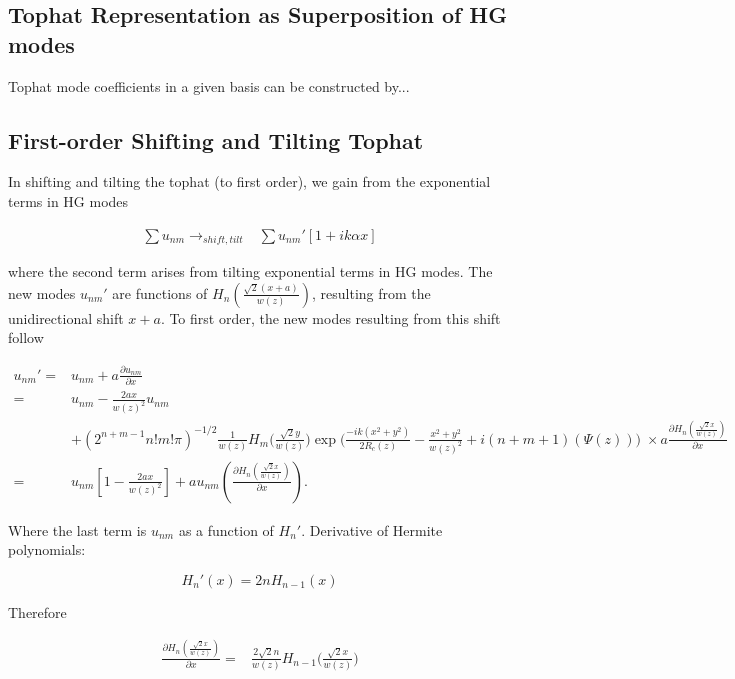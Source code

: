 \documentclass[aps,twoside,secnumarabic,balancelastpage,amsmath,amssymb,nofootinbib,hyperref=pdftex]{revtex4}
\begin{document}
\subsection{Tophat Representation as Superposition of HG modes}

Tophat mode coefficients in a given basis can be constructed by...

\clearpage

\subsection{First-order Shifting and Tilting Tophat}

In shifting and tilting the tophat (to first order), we gain from the exponential terms in HG modes

\begin{align*}
\sum u_{nm} \rightarrow_{shift,tilt} &
    \sum u_{nm}' \left[
        1+ i k \alpha x
    \right]
\end{align*}


where the second term arises from tilting exponential terms in HG modes. The new modes $u_{nm}'$ are functions of $H_n(\frac{\sqrt{2}(x+a)}{w(z)})$, resulting from the unidirectional shift $x+a$. To first order, the new modes resulting from this shift follow

\begin{align*}
	u_{nm}' =& u_{nm} + a \frac{\partial u_{nm}}{\partial x}
	\\=&
		u_{nm} 
		-
		\frac{2ax}{w(z)^2} 
		u_{nm}
		\\&+
		(2^{n+m-1}n!m!\pi)^{-1/2}
		\frac{1}{w(z)}
		H_{m} \Big(\frac{\sqrt{2}y}{w(z)} \Big)
		\exp \Big(\frac{-ik(x^{2}+y^{2})}{2R_{c}(z)}-
		\frac{x^{2}+y^{2}}{w(z)^{2}} 
		+i(n+m+1)(\Psi(z))		
		\Big)\;
		\times
		a 		
		\frac{\partial H_n(\frac{\sqrt{2}x }{w(z)})}{\partial x}
			\\=&
		u_{nm}
		[
		1
		-
		\frac{2ax}{w(z)^2}]		
		+
		a 	
		u_{nm}(	
		\frac{\partial H_n(\frac{\sqrt{2}x }{w(z)})}{\partial x}
		)
		.
\end{align*}

Where the last term is $u_{nm}$ as a function of $H_n'$. Derivative of Hermite polynomials:


\begin{equation*}
	H_n'(x) = 2n H_{n-1} (x)
\end{equation*}

Therefore

\begin{align*}
	\frac{\partial H_n(\frac{\sqrt{2}x }{w(z)})}{\partial x}
	=&
	\frac{2 \sqrt{2} n}{w(z)} H_{n-1}\Big(\frac{\sqrt{2}x}{w(z)}\Big)
\end{align*}
\end{document}
